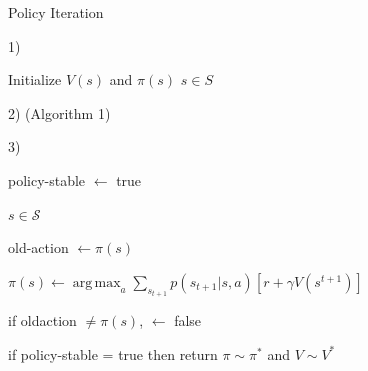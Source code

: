 \documentclass{beamer}
\DeclareMathOperator*{\argmax}{arg\,max}
\begin{document}
\begin{frame}{Policy Iteration}

\begin{algorithm}[H]
\caption{Policy Iteration for estimating $\pi \sim \pi^{*}$}

\vspace{1mm}

1) \textbf{}

Initialize $V(s)$ and $\pi(s)$  $s \in S$
\vspace{3mm}


2) \textbf{} (Algorithm 1)
\vspace{3mm}

3) \textbf{}

\vspace{0.5mm}

\hspace{6mm}policy-stable $\leftarrow$ true 

\vspace{0.5mm}

 \hspace{5mm} \textbf{}  $s \in \mathcal{S}$ \textbf{} 
 
 \vspace{0.4mm}
 
 \hspace{11mm} old-action $\leftarrow \pi(s)$
 
 \vspace{0.5mm}
 
 \hspace{11mm} $\pi(s) \leftarrow \argmax_a \sum_{s_{t+1}} p(s_{t+1}|s,a) [r + \gamma V(s^{t+1})]$
 
 \vspace{0.5mm}
 
 \hspace{11mm} if old\text{-}action $\neq \pi(s)$,  $\leftarrow$ false
 
 \vspace{0.5mm}
 
 \hspace{6mm}if policy-stable = true then return $\pi \sim \pi^{*}$ and $V \sim V^{*}$
 

\vspace{1mm}
\end{algorithm}

\end{frame}
\end{document}

